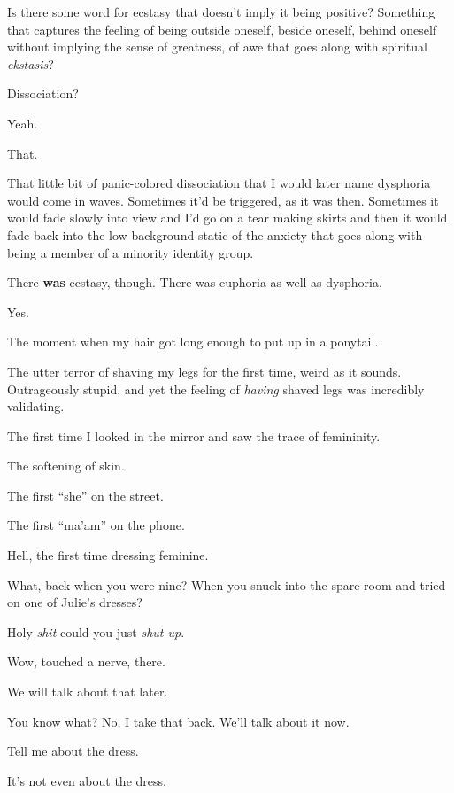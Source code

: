 \begin{paracol}{2}
\begin{leftcolumn}
Is there some word for ecstasy that doesn't imply it being positive? Something that captures the feeling of being outside oneself, beside oneself, behind oneself without implying the sense of greatness, of awe that goes along with spiritual \emph{ekstasis}?

\begin{ally}
Dissociation?
\end{ally}
Yeah.

That.

That little bit of panic-colored dissociation that I would later name dysphoria would come in waves. Sometimes it'd be triggered, as it was then. Sometimes it would fade slowly into view and I'd go on a tear making skirts and then it would fade back into the low background static of the anxiety that goes along with being a member of a minority identity group.

\begin{ally}
There \textbf{was} ecstasy, though. There was euphoria as well as dysphoria.
\end{ally}
Yes.

The moment when my hair got long enough to put up in a ponytail.

The utter terror of shaving my legs for the first time, weird as it sounds. Outrageously stupid, and yet the feeling of \emph{having} shaved legs was incredibly validating.

The first time I looked in the mirror and saw the trace of femininity.

The softening of skin.

The first ``she'' on the street.

The first ``ma'am'' on the phone.

Hell, the first time dressing feminine.

\begin{ally}
What, back when you were nine? When you snuck into the spare room and tried on one of Julie's dresses?
\end{ally}
Holy \emph{shit} could you just \emph{shut up}.

\begin{ally}
Wow, touched a nerve, there.
\end{ally}
We will talk about that later.
\newpage

\noindent You know what? No, I take that back. We'll talk about it now.

\begin{ally}
Tell me about the dress.
\end{ally}
It's not even about the dress.
\newpage
\end{leftcolumn}
\end{paracol}

